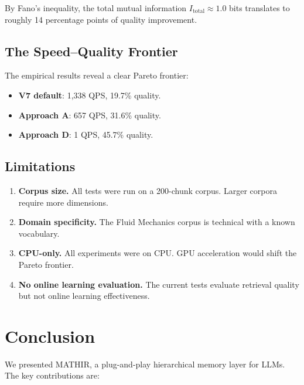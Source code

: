 \documentclass[12pt,a4paper]{article}
\theoremstyle{definition}
\theoremstyle{remark}
\newcommand{\MATHIR}{\textsc{MATHIR}}
\begin{document}
By Fano's inequality, the total mutual information $I_{\mathrm{total}} \approx 1.0$ bits translates to roughly 14 percentage points of quality improvement.

\subsection{The Speed--Quality Frontier}

The empirical results reveal a clear Pareto frontier:
\begin{itemize}
    \item \textbf{V7 default}: 1,338 QPS, 19.7\% quality.
    \item \textbf{Approach A}: 657 QPS, 31.6\% quality.
    \item \textbf{Approach D}: 1 QPS, 45.7\% quality.
\end{itemize}

\subsection{Limitations}

\begin{enumerate}
    \item \textbf{Corpus size.} All tests were run on a 200-chunk corpus. Larger corpora require more dimensions.
    \item \textbf{Domain specificity.} The Fluid Mechanics corpus is technical with a known vocabulary.
    \item \textbf{CPU-only.} All experiments were on CPU. GPU acceleration would shift the Pareto frontier.
    \item \textbf{No online learning evaluation.} The current tests evaluate retrieval quality but not online learning effectiveness.
\end{enumerate}

\section{Conclusion}
\label{sec:conclusion}

We presented \MATHIR{}, a plug-and-play hierarchical memory layer for LLMs. The key contributions are:
\end{document}
